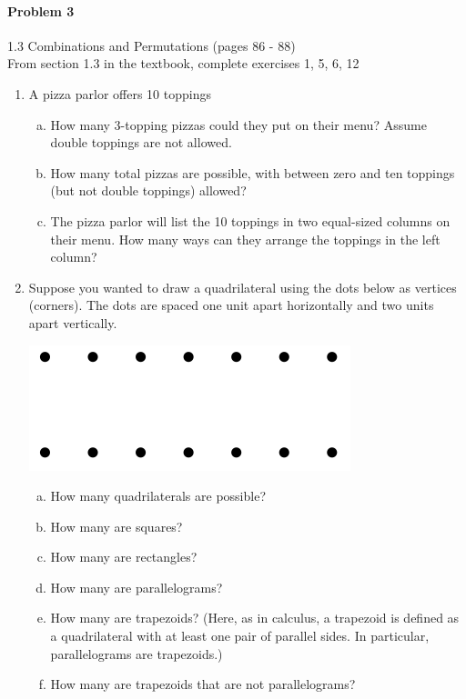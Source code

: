 \documentclass[11pt, a4paper]{article}
\newcommand\setItemNumber[1]{\setcounter{enumi}{\numexpr#1-1\relax}}
\begin{document}
	\paragraph{Problem 3} 1.3 Combinations and Permutations (pages 86 - 88)\\
	From section 1.3 in the textbook, complete exercises 1, 5, 6, 12
    \begin{enumerate}

        \item A pizza parlor offers 10 toppings
            \begin{enumerate}[(a)]
                \item How many 3-topping pizzas could they put on their menu? Assume double toppings are not allowed.
                \item How many total pizzas are possible, with between zero and ten toppings (but not double toppings) allowed?

                \item The pizza parlor will list the 10 toppings in two equal-sized columns on their menu. How many ways can they arrange the toppings in the left column?

            \end{enumerate}

        \setItemNumber{5}
        \item Suppose you wanted to draw a quadrilateral using the dots below as vertices (corners). The dots are spaced one unit apart horizontally and two units apart vertically.

            \begin{center}
            \includegraphics[width=.5\textwidth]{hw4_graphic1}
            \end{center}

            \begin{enumerate}[(a)]
                \item How many quadrilaterals are possible?
                \item How many are squares?
                \item How many are rectangles?
                \item How many are parallelograms?
                \item How many are trapezoids? (Here, as in calculus, a trapezoid is defined as a quadrilateral with at least one pair of parallel sides. In particular, parallelograms are trapezoids.)
                \item How many are trapezoids that are not parallelograms?


\end{enumerate}
\end{enumerate}
\end{document}
